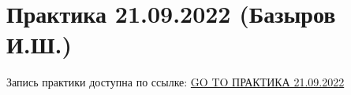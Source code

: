 \documentclass[main.tex]{subfiles}
\begin{document}

\section{Практика 21.09.2022 (Базыров И.Ш.)}

Запись практики доступна по ссылке: \href{https://disk.yandex.ru/d/HeQUisnwV0K5EQ/\%D0\%92\%D1\%82\%D0\%BE\%D1\%80\%D0\%BE\%D0\%B9\%20\%D0\%BA\%D1\%83\%D1\%80\%D1\%81\%20\%D0\%BC\%D0\%B0\%D0\%B3\%D0\%B8\%D1\%81\%D1\%82\%D1\%80\%D0\%B0\%D1\%82\%D1\%83\%D1\%80\%D1\%8B/\%D0\%93\%D0\%B8\%D0\%B4\%D1\%80\%D0\%BE\%D0\%B4\%D0\%B8\%D0\%BD\%D0\%B0\%D0\%BC\%D0\%B8\%D1\%87\%D0\%B5\%D1\%81\%D0\%BA\%D0\%BE\%D0\%B5\%20\%D0\%BC\%D0\%BE\%D0\%B4\%D0\%B5\%D0\%BB\%D0\%B8\%D1\%80\%D0\%BE\%D0\%B2\%D0\%B0\%D0\%BD\%D0\%B8\%D0\%B5/2022_09_21_\%D0\%93\%D0\%94\%D0\%9C_\%D0\%BF\%D1\%80\%D0\%B0\%D0\%BA\%D1\%82\%D0\%B8\%D0\%BA\%D0\%B02.mp4}{GO TO ПРАКТИКА 21.09.2022}
\end{document}
